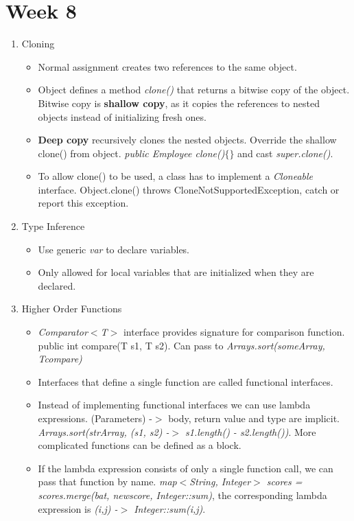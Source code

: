 \documentclass[a4paper]{article}
\begin{document}
\section{Week 8}
\begin{enumerate}
    \item Cloning
    \begin{itemize}
        \item Normal assignment creates two references to the same object.
        \item Object defines a method \textit{clone()} that returns a bitwise copy of the object. Bitwise copy is \textbf{shallow copy}, as it copies the references to nested objects instead of initializing fresh ones.
        \item \textbf{Deep copy} recursively clones the nested objects. Override the shallow clone() from object. \textit{public Employee clone()$\{\}$} and cast \textit{super.clone()}.
        \item To allow clone() to be used, a class has to implement a \textit{Cloneable} interface. Object.clone() throws CloneNotSupportedException, catch or report this exception.
    \end{itemize}
    \item Type Inference
    \begin{itemize}
        \item Use generic \textit{var} to declare variables.
        \item Only allowed for local variables that are initialized when they are declared.
    \end{itemize}
    \item Higher Order Functions
    \begin{itemize}
        \item \textit{Comparator$<$T$>$} interface provides signature for comparison function. public int compare(T s1, T s2). Can pass to \textit{Arrays.sort(someArray, Tcompare)}
        \item Interfaces that define a single function are called functional interfaces.
        \item Instead of implementing functional interfaces we can use lambda expressions. (Parameters) -$>$ body, return value and type are implicit. \textit{Arrays.sort(strArray, (s1, s2) -$>$ s1.length() - s2.length())}. More complicated functions can be defined as a block.
        \item If the lambda expression consists of only a single function call, we can pass that function by name. \textit{map$<$String, Integer$>$ scores = scores.merge(bat, newscore, Integer::sum)}, the corresponding lambda expression is \textit{(i,j) -$>$ Integer::sum(i,j)}.

\end{itemize}
\end{enumerate}
\end{document}
